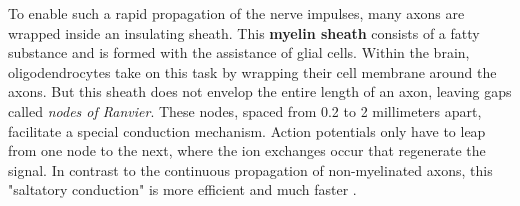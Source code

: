     To enable such a rapid propagation of the nerve impulses, many axons are wrapped inside an insulating sheath. This \textbf{myelin sheath} consists of a fatty substance and is formed with the assistance of glial cells. Within the brain, oligodendrocytes take on this task by wrapping their cell membrane around the axons.
        But this sheath does not envelop the entire length of an axon, leaving gaps called \textit{nodes of Ranvier}. These nodes, spaced from 0.2 to 2 millimeters apart, facilitate a special conduction mechanism. Action potentials only have to leap from one node to the next, where the ion exchanges occur that regenerate the signal. In contrast to the continuous propagation of non-myelinated axons, this "saltatory conduction" is more efficient and much faster \cite{thebrain-SimpleToComplex-cellularFunction-i}.

 

